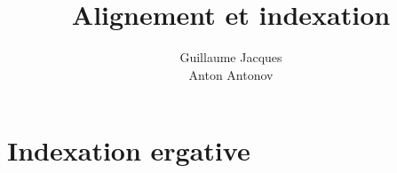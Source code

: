 \documentclass[oldfontcommands,twoside,a4paper,12pt]{article}
\newcommand{\ipa}[1]{{\phon\textbf{#1}}}
\begin{document}
\title{Alignement et indexation}
\author{Guillaume Jacques\\Anton Antonov}
\maketitle
 

%
%
%
%
 
 \section{Indexation ergative}
%
\end{document}

